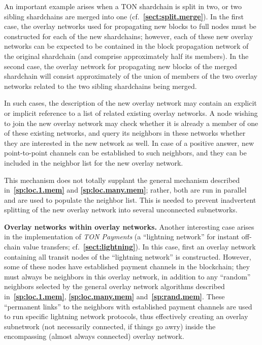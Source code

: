 \documentclass[12pt,oneside]{article}
\def\makepoint#1{\medbreak\noindent{\bf #1.\ }}
\def\nxsubpoint{\refstepcounter{subsubsection}%
  \smallbreak\makepoint{\thesubsubsection}}
\def\refpoint#1{{\rm\textbf{\ref{#1}}}}
\let\ptref=\refpoint
\def\embt(#1.){\textbf{#1.}}
\begin{document}
An important example arises when a TON shardchain is split in two, or
two sibling shardchains are merged into one
(cf.~\ptref{sect:split.merge}). In the first case, the overlay
networks used for propagating new blocks to full nodes must be
constructed for each of the new shardchains; however, each of these
new overlay networks can be expected to be contained in the block
propagation network of the original shardchain (and comprise
approximately half its members). In the second case, the overlay
network for propagating new blocks of the merged shardchain will
consist approximately of the union of members of the two overlay
networks related to the two sibling shardchains being merged.

In such cases, the description of the new overlay network may contain
an explicit or implicit reference to a list of related existing
overlay networks. A node wishing to join the new overlay network may
check whether it is already a member of one of these existing
networks, and query its neighbors in these networks whether they are
interested in the new network as well. In case of a positive answer,
new point-to-point channels can be established to such neighbors, and
they can be included in the neighbor list for the new overlay network.

This mechanism does not totally supplant the general mechanism
described in~\ptref{sp:loc.1.mem} and \ptref{sp:loc.many.mem}; rather,
both are run in parallel and are used to populate the neighbor
list. This is needed to prevent inadvertent splitting of the new
overlay network into several unconnected subnetworks.

\nxsubpoint\label{sp:net.within.net} \embt(Overlay networks within
overlay networks.)  Another interesting case arises in the
implementation of {\em TON Payments} (a ``lightning network'' for
instant off-chain value transfers; cf.~\ptref{sect:lightning}). In
this case, first an overlay network containing all transit nodes of
the ``lightning network'' is constructed. However, some of these nodes
have established payment channels in the blockchain; they must always
be neighbors in this overlay network, in addition to any ``random''
neighbors selected by the general overlay network algorithms described
in~\ptref{sp:loc.1.mem}, \ptref{sp:loc.many.mem}
and~\ptref{sp:rand.mem}. These ``permanent links'' to the neighbors
with established payment channels are used to run specific lightning
network protocols, thus effectively creating an overlay subnetwork
(not necessarily connected, if things go awry) inside the encompassing
(almost always connected) overlay network.
\end{document}
